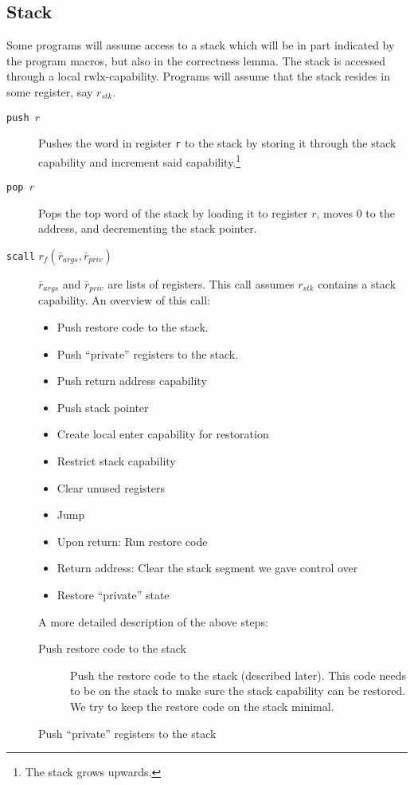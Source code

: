 \documentclass[a4paper]{article}
\newcommand{\var}[1]{\mathit{#1}}
\newcommand{\plainperm}[1]{\mathrm{#1}}
\newcommand{\rwlx}{\plainperm{rwlx}}
\begin{document}
\subsection{Stack}
Some programs will assume access to a stack which will be in part indicated by the program macros, but also in the correctness lemma. The stack is accessed through a local $\rwlx$-capability. Programs will assume that the stack resides in some register, say $r_{\var{stk}}$.
\begin{description}
\item[\texttt{push $r$}] Pushes the word in register \texttt{r} to the stack by storing it through the stack capability and increment said capability.\footnote{The stack grows upwards.}
\item[\texttt{pop $r$}] Pops the top word of the stack by loading it to register $r$, moves 0 to the address, and decrementing the stack pointer.
\item[\texttt{scall} $r_f(\bar{r}_{\var{args}},\bar{r}_{\var{priv}})$] $\bar{r}_{\var{args}}$ and $\bar{r}_{\var{priv}}$ are lists of registers. This call assumes $r_{\var{stk}}$ contains a stack capability. An overview of this call:
  \begin{itemize}
  \item Push restore code to the stack.
  \item Push ``private'' registers to the stack.
  \item Push return address capability 
  \item Push stack pointer
  \item Create local enter capability for restoration
  \item Restrict stack capability
  \item Clear unused registers
  \item Jump
  \item Upon return: Run restore code
  \item Return address: Clear the stack segment we gave control over
  \item Restore ``private'' state
  \end{itemize}
A more detailed description of the above steps:
\begin{description}
  \item [Push restore code to the stack]
    Push the restore code to the stack (described later). This code needs to be on the stack to make sure the stack capability can be restored. We try to keep the restore code on the stack minimal.
  \item [Push ``private'' registers to the stack]

\end{description}
\end{description}
\end{document}
